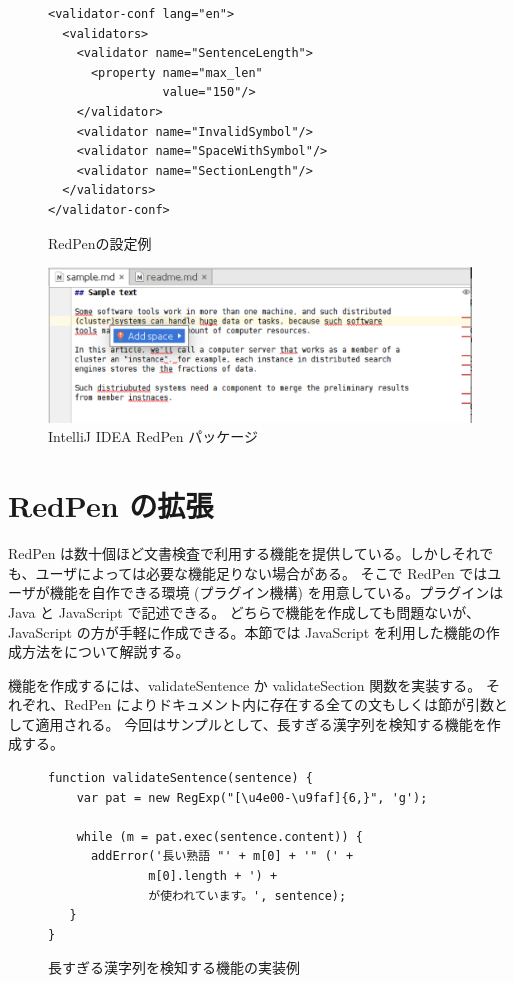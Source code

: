 \begin{figure}
  \scriptsize
  \small
  \begin{verbatim}
<validator-conf lang="en">
  <validators>
    <validator name="SentenceLength">
      <property name="max_len"
                value="150"/>
    </validator>
    <validator name="InvalidSymbol"/>
    <validator name="SpaceWithSymbol"/>
    <validator name="SectionLength"/>
  </validators>
</validator-conf>
  \end{verbatim}
  \normalsize
  \caption{RedPenの設定例}
  \label{fig:conf}
\end{figure}

\begin{figure}[t]
  \begin{center}
    \includegraphics[width=15cm]{figs/quick-fix.eps}
    \caption{IntelliJ IDEA RedPen パッケージ}
    \label{fig:intellij-idea}
  \end{center}
\end{figure}

\section{RedPen の拡張}
\label{sec:extension}
RedPen は数十個ほど文書検査で利用する機能を提供している。しかしそれでも、ユーザによっては必要な機能足りない場合がある。
そこで RedPen ではユーザが機能を自作できる環境 (プラグイン機構) を用意している。プラグインは Java と JavaScript で記述できる。
どちらで機能を作成しても問題ないが、JavaScript の方が手軽に作成できる。本節では JavaScript を利用した機能の作成方法をについて解説する。

機能を作成するには、validateSentence か validateSection 関数を実装する。
それぞれ、RedPen によりドキュメント内に存在する全ての文もしくは節が引数として適用される。
今回はサンプルとして、長すぎる漢字列を検知する機能を作成する。

\begin{figure}
  \scriptsize
  \small
  \begin{verbatim}
function validateSentence(sentence) {
    var pat = new RegExp("[\u4e00-\u9faf]{6,}", 'g');

    while (m = pat.exec(sentence.content)) {
      addError('長い熟語 "' + m[0] + '" (' +
              m[0].length + ') +
              が使われています。', sentence);
   }
}
  \end{verbatim}
  \normalsize
  \caption{長すぎる漢字列を検知する機能の実装例}
  \label{fig:js-validator}
\end{figure}

